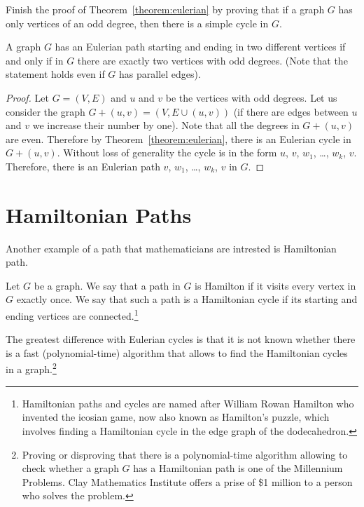 \begin{exercise}
  Finish the proof of Theorem~\ref{theorem:eulerian} by proving that if a graph
  $G$ has only vertices of an odd degree, then there is a simple cycle in $G$.
\end{exercise}

\begin{corollary}
  A graph $G$ has an Eulerian path starting and ending in two different
  vertices if and only if in $G$ there are exactly two vertices with odd
  degrees.
  (Note that the statement holds even if $G$ has parallel edges).
\end{corollary}
\begin{proof}
  Let $G = (V, E)$ and $u$ and $v$ be the vertices with odd degrees. Let us
  consider the graph $G + (u, v) = (V, E \cup (u, v))$ (if there are edges
  between $u$ and $v$ we increase their number by one). Note that all
  the degrees in $G + (u, v)$ are even.
  Therefore by Theorem~\ref{theorem:eulerian}, there is an Eulerian cycle in
  $G + (u, v)$. Without loss of generality the cycle is in the form $u$, $v$,
  $w_1$, \dots, $w_k$, $v$. Therefore, there is an Eulerian path $v$,
  $w_1$, \dots, $w_k$, $v$ in $G$.
\end{proof}

\section{Hamiltonian Paths}

Another example of a path that mathematicians are intrested is Hamiltonian path.
\begin{definition}
  Let $G$ be a graph. We say that a path in $G$ is Hamilton
  if it visits every vertex in $G$ exactly once. We say that such a path is a
  Hamiltonian cycle if its starting and ending vertices are
  connected.\footnote{%
    Hamiltonian paths and cycles are named after William Rowan Hamilton who
    invented the icosian game, now also known as Hamilton's puzzle, which
    involves finding a Hamiltonian cycle in the edge graph of the dodecahedron.
  }
\end{definition}

The greatest difference with Eulerian cycles is that it is not known whether
there is a fast (polynomial-time) algorithm that allows to find the Hamiltonian
cycles in a graph.\footnote{%
  Proving or disproving that there is a polynomial-time algorithm allowing to
  check whether a graph $G$ has a Hamiltonian path is one of the Millennium
  Problems. Clay Mathematics Institute offers a prise of \$1 million to a person
  who solves the problem.
}

